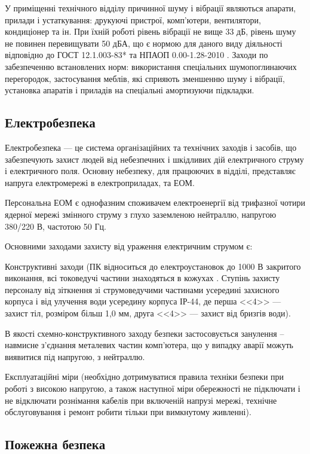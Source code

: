 У приміщенні технічного відділу причинної шуму і вібрації являються апарати, прилади і устаткування: друкуючі пристрої, комп'ютери, вентилятори, кондиціонер та ін. При їхній роботі рівень вібрації не вище 33 дБ, рівень шуму не повинен перевищувати 50 дБА, що є нормою для даного виду діяльності відповідно до ГОСТ 12.1.003-83* \cite{ber10} та НПАОП 0.00-1.28-2010 \cite{ber3}. Заходи по забезпеченню встановлених норм: використання спеціальних шумопоглинаючих перегородок, застосування меблів, які сприяють зменшенню шуму і вібрації, установка апаратів і приладів на спеціальні амортизуючи підкладки.

\subsection{Електробезпека}
Електробезпека --- це система організаційних та технічних заходів і засобів, що забезпечують захист людей від небезпечних і шкідливих дій електричного струму і електричного поля. Основну небезпеку, для працюючих в відділі, представляє напруга електромережі в електроприладах, та ЕОМ.

Персональна ЕОМ є однофазним споживачем електроенергії від трифазної чотири ядерної мережі змінного струму з глухо заземленою нейтраллю, напругою 380/220 В, частотою 50 Гц.

Основними заходами захисту від ураження електричним струмом є:
\begin{longEnumerate}
\item Конструктивні заходи (ПК відноситься до електроустановок до 1000 В закритого виконання, всі токоведучі частини знаходяться в кожухах \cite{ber10}. Ступінь захисту персоналу від зіткнення зі струмоведучими частинами усередині захисного корпуса і від улучення води усередину корпуса ІР-44, де перша <<4>> --- захист тіл, розміром більш 1,0 мм, друга <<4>> --- захист від бризгів води).
\item В якості схемно-конструктивного заходу безпеки застосовується занулення – навмисне з’єднання металевих частин комп’ютера, що у випадку аварії можуть виявитися під напругою, з нейтраллю.
\item Експлуатаційні міри (необхідно дотримуватися правила техніки безпеки при роботі з високою напругою, а також наступної міри обережності не підключати і не відключати рознімання кабелів при включеній напрузі мережі, технічне обслуговування і ремонт робити тільки при вимкнутому живленні).
\end{longEnumerate}

\subsection{Пожежна безпека}

